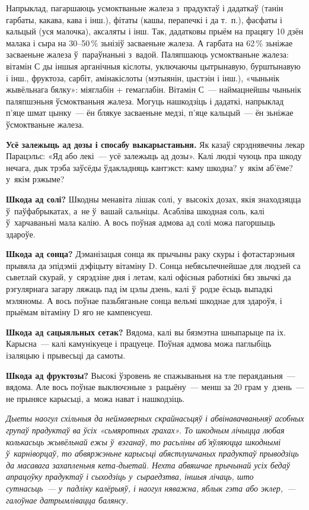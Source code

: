 Напрыклад, пагаршаюць усмоктваньне жалеза з~прадуктаў і дадаткаў (танін гарбаты, какава, кава і інш.), фітаты (кашы, перапечкі і да т.~п.), фасфаты і кальцый (уся малочка), аксаляты і інш. Так, дадатковы прыём на працягу 10 дзён малака і сыра на 30--50\,\% зьнізіў засваеньне жалеза. А гарбата на 62\,\% зьніжае засваеньне жалеза ў~параўнаньні з~вадой. Паляпшаюць усмоктваньне жалеза: вітамін С ды іншыя арганічныя кіслоты, уключаючы цытрынавую, бурштынавую і інш., фруктоза, сарбіт, амінакіслоты (мэтыянін, цыстэін і інш.), «чыньнік жывёльнага бялку»: міяглабін + гемаглабін. Вітамін С~--- наймацнейшы чыньнік паляпшэньня ўсмоктваньня жалеза. Могуць нашкодзіць і дадаткі, напрыклад п'яце шмат цынку~--- ён блякуе засваеньне медзі, п'яце кальцый~--- ён зьніжае ўсмоктваньне жалеза.

\textbf{Усё залежыць ад дозы і спосабу выкарыстаньня.} Як казаў сярэднявечны лекар Парацэльс: «Яд або лекі~--- усё залежыць ад дозы». Калі людзі чуюць пра шкоду нечага, дык трэба заўсёды ўдакладняць кантэкст: каму шкодна? у~якім аб'ёме? у~якім рэжыме?

\textbf{Шкода ад солі?} Шкодны менавіта лішак солі, у~высокіх дозах, якія знаходзяцца ў~паўфабрыкатах, а~не ў~вашай сальніцы. Асабліва шкодная соль, калі ў~харчаваньні мала калію. А вось поўная адмова ад солі можа пагоршыць здароўе.

\textbf{Шкода ад сонца?} Дэманізацыя сонца як прычыны раку скуры і фотастарэньня прывяла да эпідэміі дэфіцыту вітаміну D. Сонца небясьпечнейшае для людзей са сьветлай скурай, у~сярэдзіне дня і летам, калі офісныя работнікі бяз звычкі да рэгулярнага загару ляжаць пад ім цэлы дзень, калі ў~родзе ёсьць выпадкі мэляномы. А вось поўнае пазьбяганьне сонца вельмі шкоднае для здароўя, і прыёмам вітаміну D яго не кампенсуеш.

\textbf{Шкода ад сацыяльных сетак?} Вядома, калі вы бязмэтна шныпарыце па іх. Карысна~--- калі камунікуеце і працуеце. Поўная адмова можа паглыбіць ізаляцыю і прывесьці да самоты.

\textbf{Шкода ад фруктозы?} Высокі ўзровень яе спажываньня на тле пераяданьня~--- вядома. Але вось поўнае выключэньне з~рацыёну~--- менш за 20 грам у~дзень~--- не прынясе карысьці, а~можа нават і нашкодзіць.

\emph{Дыеты наогул схільныя да неймаверных скрайнасьцяў і абвінавачваньняў асобных групаў прадуктаў ва ўсіх «сьмяротных грахах». То шкодным лічыцца любая колькасьць жывёльнай ежы ў~вэганаў, то расьліны аб'яўляюцца шкоднымі ў~карніворцаў, то абвяржэньне карысьці абястлушчаных прадуктаў прыводзіць да масавага захапленьня кета-дыетай. Нехта абвяшчае прычынай усіх бедаў апрацоўку прадуктаў і сыходзіць у~сыраедзтва, іншыя лічаць, што сутнасьць~--- у~падліку калёрыяў, і наогул няважна, яблык гэта або эклер,~--- галоўнае датрымлівацца балянсу.}

